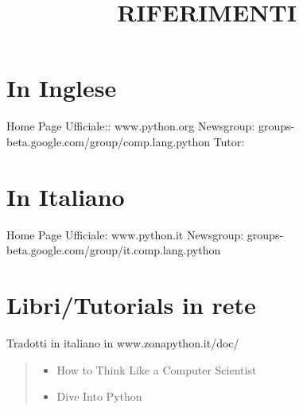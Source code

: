 \documentclass[10pt,a4paper,english]{article}
\title{RIFERIMENTI}
\author{}
\date{}
\newlength{\locallinewidth}
\begin{document}
\maketitle


\setlength{\locallinewidth}{\linewidth}



\hypertarget{in-inglese}{}
\section*{In Inglese}

Home Page Ufficiale:: www.python.org
Newsgroup: groups-beta.google.com/group/comp.lang.python
Tutor:



\hypertarget{in-italiano}{}
\section*{In Italiano}

Home Page Ufficiale: www.python.it 
Newsgroup: groups-beta.google.com/group/it.comp.lang.python



\hypertarget{libri-tutorials-in-rete}{}
\section*{Libri/Tutorials in rete}

Tradotti in italiano in www.zonapython.it/doc/
\begin{quote}
\begin{itemize}
\item {} 
How to Think Like a Computer Scientist

\item {} 
Dive Into Python

\end{itemize}
\end{quote}



\hypertarget{articoli-riviste}{}
\end{document}
